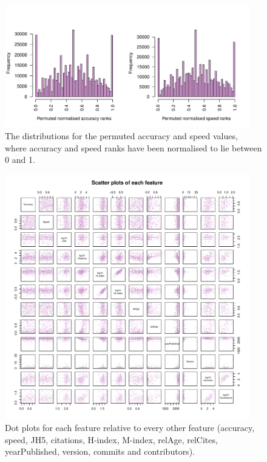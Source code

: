 \documentclass[fleqn,10pt]{SelfArx} %
\begin{document}
\begin{figure}[htb!]
\centering
\includegraphics[width=0.95\textwidth]{supplementary-distributions-permuted.pdf}
\caption{The distributions for the permuted accuracy and speed values, where accuracy and speed ranks have been normalised to lie between 0 and 1.
}
\label{fig:metricDistributionsPerm}
\end{figure}

\clearpage

\begin{figure}[H]
\centering
\includegraphics[width=0.95\textwidth]{supplementary-figures-pairs.pdf}
\caption{Dot plots for each feature relative to every other feature (accuracy, speed, JH5, citations, H-index, M-index, relAge, relCites, yearPublished, version, commits and contributors). }
\label{fig:metricPairs}
\end{figure}
\end{document}
